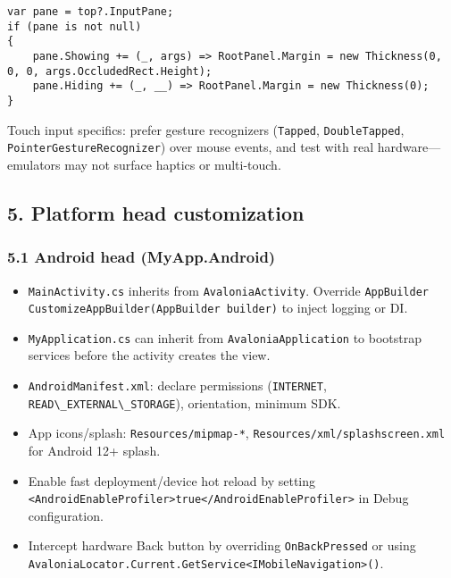 \begin{lstlisting}
var pane = top?.InputPane;
if (pane is not null)
{
    pane.Showing += (_, args) => RootPanel.Margin = new Thickness(0, 0, 0, args.OccludedRect.Height);
    pane.Hiding += (_, __) => RootPanel.Margin = new Thickness(0);
}
\end{lstlisting}

Touch input specifics: prefer gesture recognizers
(\passthrough{\lstinline!Tapped!},
\passthrough{\lstinline!DoubleTapped!},
\passthrough{\lstinline!PointerGestureRecognizer!}) over mouse events,
and test with real hardware---emulators may not surface haptics or
multi-touch.

\subsection{5. Platform head
customization}\label{platform-head-customization}

\subsubsection{5.1 Android head
(MyApp.Android)}\label{android-head-myapp.android}

\begin{itemize}
\tightlist
\item
  \passthrough{\lstinline!MainActivity.cs!} inherits from
  \passthrough{\lstinline!AvaloniaActivity!}. Override
  \passthrough{\lstinline!AppBuilder CustomizeAppBuilder(AppBuilder builder)!}
  to inject logging or DI.
\item
  \passthrough{\lstinline!MyApplication.cs!} can inherit from
  \passthrough{\lstinline!AvaloniaApplication!} to bootstrap services
  before the activity creates the view.
\item
  \passthrough{\lstinline!AndroidManifest.xml!}: declare permissions
  (\passthrough{\lstinline!INTERNET!},
  \passthrough{\lstinline!READ\_EXTERNAL\_STORAGE!}), orientation,
  minimum SDK.
\item
  App icons/splash: \passthrough{\lstinline!Resources/mipmap-*!},
  \passthrough{\lstinline!Resources/xml/splashscreen.xml!} for Android
  12+ splash.
\item
  Enable fast deployment/device hot reload by setting
  \passthrough{\lstinline!<AndroidEnableProfiler>true</AndroidEnableProfiler>!}
  in Debug configuration.
\item
  Intercept hardware Back button by overriding
  \passthrough{\lstinline!OnBackPressed!} or using
  \passthrough{\lstinline!AvaloniaLocator.Current.GetService<IMobileNavigation>()!}.
\end{itemize}

